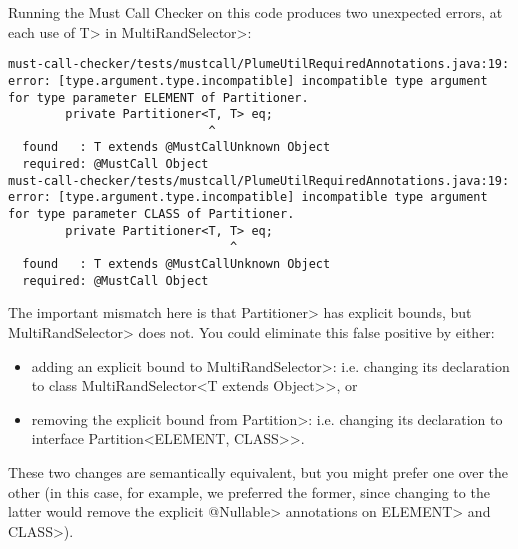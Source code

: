 Running the Must Call Checker on this code produces two unexpected errors, at each use
of \<T> in \<MultiRandSelector>:

\begin{Verbatim}
must-call-checker/tests/mustcall/PlumeUtilRequiredAnnotations.java:19: error: [type.argument.type.incompatible] incompatible type argument for type parameter ELEMENT of Partitioner.
        private Partitioner<T, T> eq;
                            ^
  found   : T extends @MustCallUnknown Object
  required: @MustCall Object
must-call-checker/tests/mustcall/PlumeUtilRequiredAnnotations.java:19: error: [type.argument.type.incompatible] incompatible type argument for type parameter CLASS of Partitioner.
        private Partitioner<T, T> eq;
                               ^
  found   : T extends @MustCallUnknown Object
  required: @MustCall Object
\end{Verbatim}

The important mismatch here is that \<Partitioner> has explicit bounds, but \<MultiRandSelector>
does not. You could eliminate this false positive by either:
\begin{itemize}
\item adding an explicit bound to \<MultiRandSelector>: i.e. changing its declaration to \<class MultiRandSelector<T extends Object>>, or
\item removing the explicit bound from \<Partition>: i.e. changing its declaration to \<interface Partition<ELEMENT, CLASS>>.
\end{itemize}

These two changes are semantically equivalent, but you might prefer one over the other (in this case, for example,
we preferred the former, since changing to the latter would remove the explicit \<@Nullable> annotations on
\<ELEMENT> and \<CLASS>).

